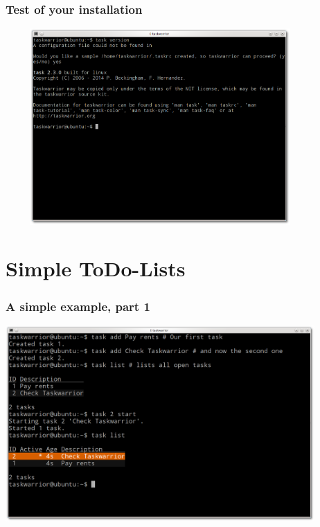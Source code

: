 \documentclass[t,handout]{beamer}
\begin{document}
\begin{frame}[fragile]\frametitle{Test of your installation}
\begin{center} %
\includegraphics[width=11.8cm,height=7.5cm]{task-version.png}
\end{center}
\end{frame}

\section{Simple ToDo-Lists}

\begin{frame}[fragile]\frametitle{A simple example, part 1}
\begin{center} %
\includegraphics[width=11.8cm,height=7.5cm]{simple-example1.png}
\end{center}
\end{frame}
\end{document}
